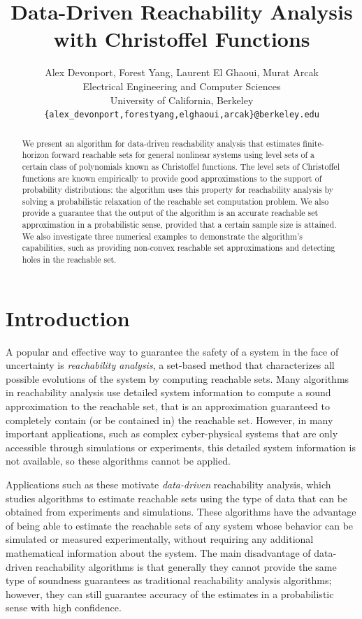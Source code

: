 \documentclass[letterpaper, 10 pt, conference]{ieeeconf}
\title{\LARGE \bf
Data-Driven Reachability Analysis with Christoffel Functions
}
\author{ \parbox{5 in}{\centering Alex Devonport, Forest Yang, Laurent El
        Ghaoui, Murat Arcak\\
         Electrical Engineering and Computer Sciences\\
         University of California, Berkeley\\
     {\centering \tt\small \{alex\_devonport,forestyang,elghaoui,arcak\}@berkeley.edu}}
}
\begin{document}
\maketitle
\thispagestyle{empty}
\pagestyle{empty}

\begin{abstract}
We present an algorithm for data-driven reachability analysis that estimates
finite-horizon forward reachable sets for general nonlinear systems using
level sets of a certain class of polynomials known as Christoffel
functions. The level sets of Christoffel functions are known empirically to
provide good approximations to the support of probability distributions: the
algorithm uses this property for reachability analysis by solving a
probabilistic relaxation of the reachable set computation problem. We also
provide a guarantee that the output of the algorithm is an accurate
reachable set approximation in a probabilistic sense, provided that a certain
sample size is attained. We also investigate three numerical examples to
demonstrate the algorithm's capabilities, such as providing non-convex
reachable set approximations and detecting holes in the reachable set.
\end{abstract}

\maketitle

\section{Introduction}

A popular and effective way to guarantee the safety of a system
in the face of uncertainty is \emph{reachability analysis}, a set-based method
that characterizes all possible evolutions of the system by computing reachable sets.
Many algorithms in reachability analysis use detailed
system information to compute a sound approximation to the reachable set, that
is an approximation guaranteed to completely contain (or be contained in) the
reachable set. However,
in many important applications, such as 
%
complex
cyber-physical systems that
are only accessible through simulations or experiments, this detailed
system information is not available, so these algorithms cannot be applied.

Applications such as these motivate \emph{data-driven} reachability analysis,
which studies algorithms to estimate reachable sets using the type of data
that can be obtained from experiments and simulations. 
These algorithms have the advantage of being able to estimate %
the
reachable sets of any system whose behavior can be simulated or measured
experimentally, without requiring any additional mathematical information about
the system. The main disadvantage of data-driven reachability algorithms is that
generally 
they
cannot provide the same type of soundness guarantees as
traditional reachability analysis algorithms; however, they can still 
%
guarantee accuracy of the estimates
in a
probabilistic sense with high confidence.
\end{document}
